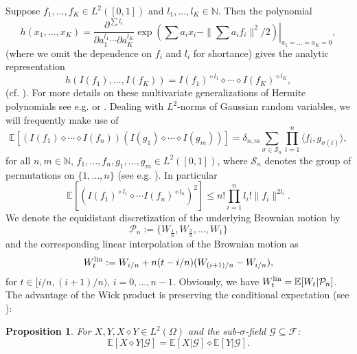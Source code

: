 \documentclass[a4paper,11pt,reqno]{amsart}
\theoremstyle{plain}
\newtheorem{proposition}[theorem]{Proposition}
\def\N{\mathbb{N}}
\def\P{\mathcal{P}}
\def\ex{\mathbb{E}}
\def\lin{{\rm lin}}
\numberwithin{equation}{section}
\begin{document}
Suppose $f_1, \ldots, f_K \in L^2([0,1])$ and $l_1,\ldots, l_K \in \N$. Then the polynomial
\[
h(x_1,\ldots, x_K) =  \dfrac{\partial^{\sum l_i}}{\partial a_1^{l_1} \cdots \partial a_K^{l_K}} \left.\exp\left(\sum a_i x_i - \|\sum a_i f_i\|^2/2\right)\right|_{a_1=\ldots =a_K=0}, 
\]
(where we omit the dependence on $f_i$ and $l_i$ for shortance) gives the analytic representation
\begin{equation}\label{eq:WickProductByWickExponential}
h(I(f_1),\ldots, I(f_K)) = I(f_1)^{\diamond l_1} \diamond \cdots \diamond I(f_K)^{\diamond l_K},
\end{equation}
(cf. \cite[Chapter 3]{Janson}). For more details on these multivariate generalizations of Hermite polynomials see e.g. \cite{Avram_Taqqu} or \cite{P2}. Dealing with $L^2$-norms of Gaussian random variables, we will frequently make use of
\begin{equation}\label{eq:NormOFWickProductGaussian}
\ex\left[\left(I(f_1) \diamond \cdots \diamond I(f_n)\right) \left(I(g_1) \diamond \cdots \diamond I(g_m)\right)\right] = \delta_{n,m} \sum\limits_{\sigma \in \mathcal{S}_{n}} \prod\limits_{i=1}^{n} \langle f_i, g_{\sigma(i)}\rangle,
\end{equation}
for all $n,m \in \N$, $f_1,\ldots, f_n, g_1,\ldots, g_m \in L^2([0,1])$, where $\mathcal{S}_{n}$ denotes the group of permutations on $\{1, \ldots, n\}$ (see e.g. \cite[Theorem 3.9]{Janson}). In particular
\begin{equation}\label{eq:L2NormWickProductInequality}
\ex\left[\left(I(f_1)^{\diamond l_1} \diamond \cdots I(f_n)^{\diamond l_n}\right)^2\right] \leq n! \prod_{i=1}^n l_i! \|f_i\|^{2 l_i}.
\end{equation}
We denote the equidistant discretization of the underlying Brownian motion by
$$
\P_n:= \{W_{\frac{1}{n}}, W_{\frac{2}{n}}, \ldots, W_1\}
$$ 
and the corresponding linear interpolation of the Brownian motion as
$$
W_t^{\lin} := W_{i/n} + n(t-i/n)(W_{(i+1)/n}-W_{i/n}),
$$
for $t \in [i/n, (i+1)/n)$, $i =0,\ldots, n-1$. Obviously, we have $W_t^{\lin} = \ex[W_t|\P_n]$. The advantage of the Wick product is preserving the conditional expectation (see \cite[Corollary 9.4]{Janson}):

\begin{proposition}\label{prop:WickConditionalExpectation}
For $X,Y, X\diamond Y \in L^2(\Omega)$ and the sub-$\sigma$-field $\mathcal{G} \subseteq \mathcal{F}$:
$$
\ex[X\diamond Y|\mathcal{G}] = \ex[X|\mathcal{G}]\diamond \ex[Y|\mathcal{G}].
$$ 
\end{proposition}
\end{document}

